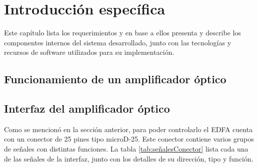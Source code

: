 \chapter{Introducción específica} %

\label{Chapter2}


Este capítulo lista los requerimientos y en base a ellos presenta y describe los componentes internos del sistema desarrollado, junto con las tecnologías y recursos de software utilizados para su implementación. 

\section{Funcionamiento de un amplificador óptico}
\label{sec:funcAmp}

\section{Interfaz del amplificador óptico}
\label{sec:intAmp}

Como se mencionó en la sección anterior, para poder controlarlo el EDFA cuenta con un conector de 25 pines tipo microD-25. Este conector contiene varios grupos de señales con distintas funciones. La tabla \ref{tab:señalesConector} lista cada una de las señales de la interfaz, junto con los detalles de su dirección, tipo y función.

